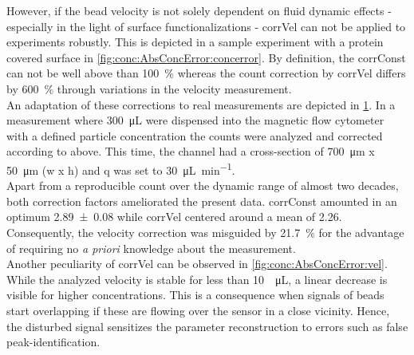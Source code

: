 \begin{figure}[h!]
	\centering
	 \hfill
	\addtocounter{subfigure}{-1}
	\label{fig:conc:AbsConcError}
\end{figure}
However, if the bead velocity is not solely dependent on fluid dynamic effects - especially in the light of surface functionalizations - \gls{corrVel} can not be applied to experiments robustly. This is depicted in a sample experiment with a protein covered surface in \cref{fig:conc:AbsConcError:concerror}. By definition, the \gls{corrConst} can not be well above than \SI{100}{\percent} whereas the count correction by \gls{corrVel} differs by \SI{600}{\percent} through variations in the velocity measurement. \\
An adaptation of these corrections to real measurements are depicted in \cref{fig:conc:AbsConcError}. In a measurement where \SI{300}{\micro\liter} were dispensed into the magnetic flow cytometer with a defined particle concentration the counts were analyzed and corrected according to above. This time, the channel had a cross-section of \SI{700}{\micro\meter} x \SI{50}{\micro\meter} (w x h) and \gls{q} was set to \SI{30}{\micro\liter\per\minute}.\\
Apart from a reproducible count over the dynamic range of almost two decades, both correction factors ameliorated the present data. \gls{corrConst} amounted in an optimum \num{2,89 +- 0,08} while \gls{corrVel} centered around a mean of \num{2,26}. Consequently, the velocity correction was misguided by \SI{21.7}{\percent} for the advantage of requiring no \textit{a priori} knowledge about the measurement.\\
Another peculiarity of \gls{corrVel} can be observed in \cref{fig:conc:AbsConcError:vel}. While the analyzed velocity is stable for less than \SI{10}{\per\micro\liter}, a linear decrease is visible for higher concentrations. This is a consequence when signals of beads start overlapping if these are flowing over the sensor in a close vicinity. Hence, the disturbed signal sensitizes the parameter reconstruction to errors such as false peak-identification.
